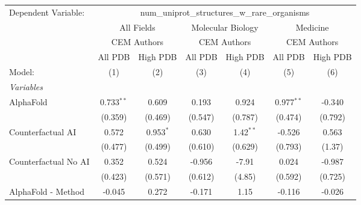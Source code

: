 \begingroup
\centering
\begin{tabular}{lcccccc}
   \tabularnewline \midrule \midrule
   Dependent Variable: & \multicolumn{6}{c}{num\_uniprot\_structures\_w\_rare\_organisms}\\
 & \multicolumn{2}{c}{All Fields} & \multicolumn{2}{c}{Molecular Biology} & \multicolumn{2}{c}{Medicine} \\
\cmidrule(lr){2-3} \cmidrule(lr){4-5} \cmidrule(lr){6-7}
 & \multicolumn{2}{c}{CEM Authors} & \multicolumn{2}{c}{CEM Authors} & \multicolumn{2}{c}{CEM Authors} \\
\cmidrule(lr){2-3} \cmidrule(lr){4-5} \cmidrule(lr){6-7}
 & \multicolumn{1}{c}{All PDB} & \multicolumn{1}{c}{High PDB} & \multicolumn{1}{c}{All PDB} & \multicolumn{1}{c}{High PDB} & \multicolumn{1}{c}{All PDB} & \multicolumn{1}{c}{High PDB} \\
\cmidrule(lr){2-2} \cmidrule(lr){3-3} \cmidrule(lr){4-4} \cmidrule(lr){5-5} \cmidrule(lr){6-6} \cmidrule(lr){7-7}
   Model:                                                     & (1)          & (2)           & (3)           & (4)           & (5)          & (6)\\  
   \midrule
   \emph{Variables}\\
   AlphaFold                                                  & 0.733$^{**}$ & 0.609         & 0.193         & 0.924         & 0.977$^{**}$ & -0.340\\   
                                                              & (0.359)      & (0.469)       & (0.547)       & (0.787)       & (0.474)      & (0.792)\\   
   Counterfactual AI                                          & 0.572        & 0.953$^{*}$   & 0.630         & 1.42$^{**}$   & -0.526       & 0.563\\   
                                                              & (0.477)      & (0.499)       & (0.610)       & (0.629)       & (0.793)      & (1.37)\\   
   Counterfactual No AI                                       & 0.352        & 0.524         & -0.956        & -7.91         & 0.024        & -0.987\\   
                                                              & (0.423)      & (0.571)       & (0.612)       & (4.85)        & (0.592)      & (0.725)\\   
   AlphaFold - Method                                         & -0.045       & 0.272         & -0.171        & 1.15          & -0.116       & -0.026\\   

\end{tabular}
